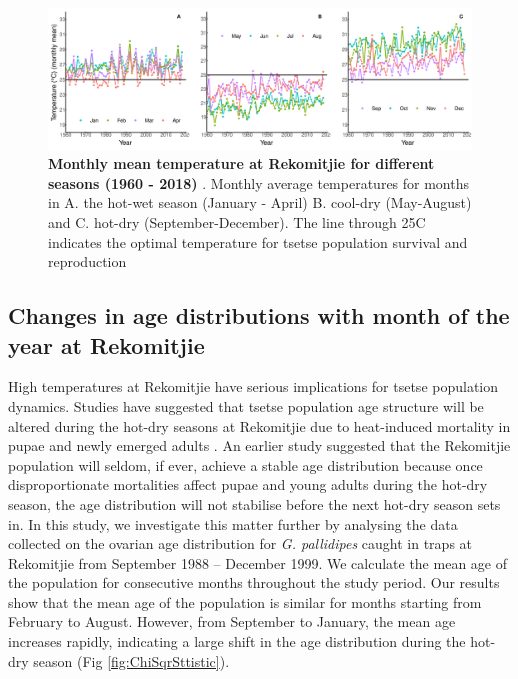 \documentclass[12pt,a4paper]{article}
\begin{document}
\begin{figure}[hbt!]
	\centering
	\includegraphics[width=1.1\linewidth]{21April20CombineTemPlot}
	\caption{{\bf Monthly mean temperature at Rekomitjie for different seasons (1960 - 2018) }. Monthly average temperatures for months in A. the hot-wet season (January - April)  B. cool-dry (May-August) and C. hot-dry (September-December). The line through 25\degree C indicates the optimal temperature for tsetse population survival and reproduction}
	\label{fig:combineTem}
\end{figure}


\newpage
\subsection*{Changes in age distributions with month of the year at Rekomitjie}
High temperatures at Rekomitjie have serious implications for tsetse population dynamics. Studies have suggested that tsetse population age structure will be altered during the hot-dry seasons at Rekomitjie due to heat-induced mortality in pupae and newly emerged adults \cite{Hargrove2013b,hargrove2015mortality,Ackley2017}. An earlier study \cite{VanSickle1988} suggested that the Rekomitjie population will seldom, if ever, achieve a stable age distribution because once disproportionate mortalities affect pupae and young adults during the hot-dry season, the age distribution will not stabilise before the next hot-dry season sets in. In this study, we investigate this matter further by analysing the data collected on the ovarian age distribution for \textit{G. pallidipes} caught in traps at Rekomitjie from September 1988 – December 1999. We calculate the mean age of the population for consecutive months throughout the study period. Our results show that the mean age of the population   is similar for months starting from February to August. However, from September to January, the mean age increases rapidly, indicating a large shift in the age distribution during the hot-dry season (Fig \ref{fig:ChiSqrSttistic}).
\end{document}
